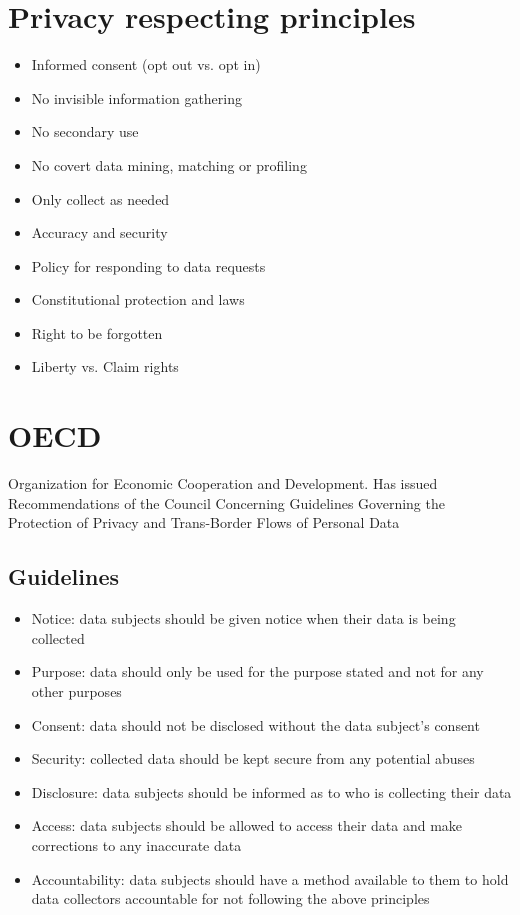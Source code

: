 \documentclass{article}
\begin{document}
\section{Privacy respecting principles}
\begin{itemize}
  \item Informed consent (opt out vs. opt in)
  \item No invisible information gathering
  \item No secondary use
  \item No covert data mining, matching or profiling
  \item Only collect as needed
  \item Accuracy and security
  \item Policy for responding to data requests
  \item Constitutional protection and laws
  \item Right to be forgotten
  \item Liberty vs. Claim rights
\end{itemize}

\section{OECD}

\begin{flushleft}
Organization for Economic Cooperation and Development. Has issued Recommendations of the Council Concerning Guidelines Governing
the Protection of Privacy and Trans-Border Flows of Personal Data
\end{flushleft}

\subsection{Guidelines}
\begin{itemize}
  \item Notice: data subjects should be given notice when their data is being collected
  \item Purpose: data should only be used for the purpose stated and not for any other purposes
  \item Consent: data should not be disclosed without the data subject’s consent
  \item Security: collected data should be kept secure from any potential abuses
  \item Disclosure: data subjects should be informed as to who is collecting their data
  \item Access: data subjects should be allowed to access their data and make corrections to any inaccurate data
  \item Accountability: data subjects should have a method available to them to hold data collectors accountable for not following the above principles
\end{itemize}
\end{document}
